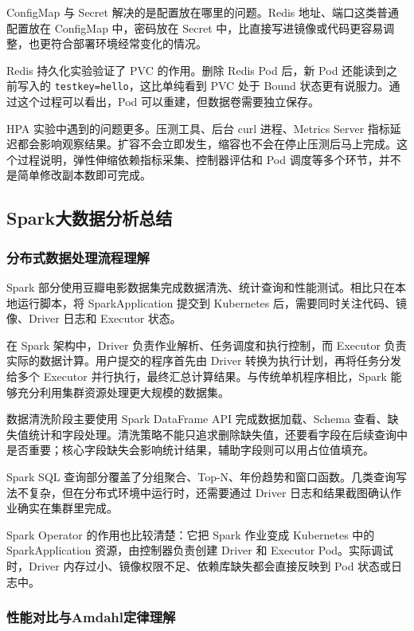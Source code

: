 ConfigMap 与 Secret 解决的是配置放在哪里的问题。Redis 地址、端口这类普通配置放在 ConfigMap 中，密码放在 Secret 中，比直接写进镜像或代码更容易调整，也更符合部署环境经常变化的情况。

Redis 持久化实验验证了 PVC 的作用。删除 Redis Pod 后，新 Pod 还能读到之前写入的 \verb|testkey=hello|，这比单纯看到 PVC 处于 Bound 状态更有说服力。通过这个过程可以看出，Pod 可以重建，但数据卷需要独立保存。

HPA 实验中遇到的问题更多。压测工具、后台 curl 进程、Metrics Server 指标延迟都会影响观察结果。扩容不会立即发生，缩容也不会在停止压测后马上完成。这个过程说明，弹性伸缩依赖指标采集、控制器评估和 Pod 调度等多个环节，并不是简单修改副本数即可完成。

\subsection{Spark大数据分析总结}

\subsubsection{分布式数据处理流程理解}

Spark 部分使用豆瓣电影数据集完成数据清洗、统计查询和性能测试。相比只在本地运行脚本，将 SparkApplication 提交到 Kubernetes 后，需要同时关注代码、镜像、Driver 日志和 Executor 状态。

在 Spark 架构中，Driver 负责作业解析、任务调度和执行控制，而 Executor 负责实际的数据计算。用户提交的程序首先由 Driver 转换为执行计划，再将任务分发给多个 Executor 并行执行，最终汇总计算结果。与传统单机程序相比，Spark 能够充分利用集群资源处理更大规模的数据集。

数据清洗阶段主要使用 Spark DataFrame API 完成数据加载、Schema 查看、缺失值统计和字段处理。清洗策略不能只追求删除缺失值，还要看字段在后续查询中是否重要；核心字段缺失会影响统计结果，辅助字段则可以用占位值填充。

Spark SQL 查询部分覆盖了分组聚合、Top-N、年份趋势和窗口函数。几类查询写法不复杂，但在分布式环境中运行时，还需要通过 Driver 日志和结果截图确认作业确实在集群里完成。

Spark Operator 的作用也比较清楚：它把 Spark 作业变成 Kubernetes 中的 SparkApplication 资源，由控制器负责创建 Driver 和 Executor Pod。实际调试时，Driver 内存过小、镜像权限不足、依赖库缺失都会直接反映到 Pod 状态或日志中。

\subsubsection{性能对比与Amdahl定律理解}

